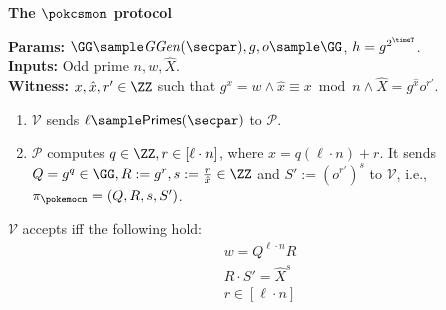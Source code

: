 \begin{mdframed}
\begin{center}
    \textbf{The $\pokcsmon$ protocol}
\end{center}
\textbf{Params:} $\GG \sample\mathit{GGen}(\secpar),g,o\sample\GG$, $h = g^{2^\timeT}$.\hfill\\
\textbf{Inputs:} Odd prime $n, w, \hat{X}$. \hfill\\
\textbf{Witness:} $x,\hat{x},r' \in \ZZ$ such that $g^x=w\land \hat{x} \equiv x \bmod{n} \land \hat{X} = g^{\hat{x}} o^{r'}$.
\hfill\\
\begin{enumerate}
    \item $\mathcal{V}$ sends $\ell \sample\mathsf{Primes}(\secpar)$ to $\mathcal{P}$.
    \item $\mathcal{P}$ computes $q\in\ZZ, r\in[\ell \cdot n]$, where $x=q(\ell \cdot n)+r$. It sends $Q=g^q\in\GG,R:=g^r,s:=\frac{r}{\hat{x}}\in\ZZ$ and $S':=(o^{r'})^s$ to $\mathcal{V}$, i.e., $\pi_{\pokemocn}=(Q,R,s,S')$.
\end{enumerate}
$\mathcal{V}$ accepts iff the following hold:
\begin{align*}
    w = Q^{\ell \cdot n}R\\
    R\cdot S'=\hat{X}^s\\
    r \in [\ell \cdot n]
\end{align*}
\end{mdframed}
